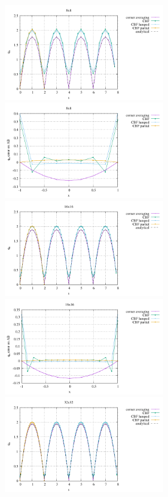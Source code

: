 \begin{center}
\includegraphics[width=7cm]{python_codes/fieldstone_173/results/exp2/heat_flux_boundary_8.pdf}
\includegraphics[width=7cm]{python_codes/fieldstone_173/results/exp2/heat_flux_boundary_bottom_8.pdf}\\
\includegraphics[width=7cm]{python_codes/fieldstone_173/results/exp2/heat_flux_boundary_16.pdf}
\includegraphics[width=7cm]{python_codes/fieldstone_173/results/exp2/heat_flux_boundary_bottom_16.pdf}\\
\includegraphics[width=7cm]{python_codes/fieldstone_173/results/exp2/heat_flux_boundary_32.pdf}

\end{center}
